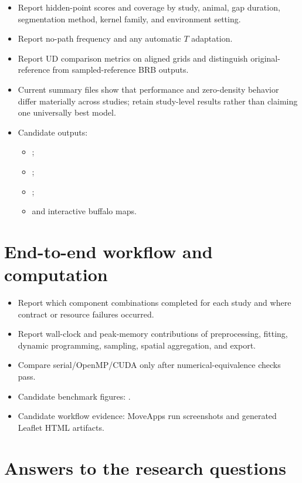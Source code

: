 \begin{itemize}
  \item Report hidden-point scores and coverage by study, animal, gap duration, segmentation method, kernel family, and environment setting.
  \item Report no-path frequency and any automatic $T$ adaptation.
  \item Report UD comparison metrics on aligned grids and distinguish original-reference from sampled-reference BRB outputs.
  \item Current summary files show that performance and zero-density behavior differ materially across studies; retain study-level results rather than claiming one universally best model.
  \item Candidate outputs:
  \begin{itemize}
    \item {};
    \item {};
    \item {};
    \item {} and interactive buffalo maps.
  \end{itemize}
\end{itemize}

\section{End-to-end workflow and computation}

\begin{itemize}
  \item Report which component combinations completed for each study and where contract or resource failures occurred.
  \item Report wall-clock and peak-memory contributions of preprocessing, fitting, dynamic programming, sampling, spatial aggregation, and export.
  \item Compare serial/OpenMP/CUDA only after numerical-equivalence checks pass.
  \item Candidate benchmark figures: .
  \item Candidate workflow evidence: MoveApps run screenshots and generated Leaflet HTML artifacts.
\end{itemize}

\section{Answers to the research questions}

